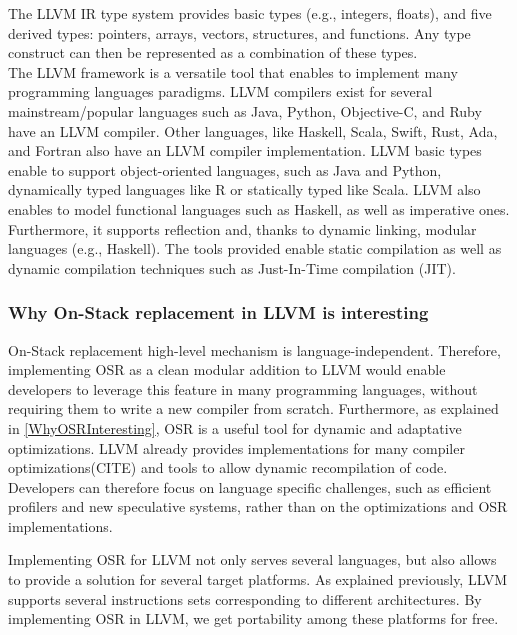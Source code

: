The LLVM IR type system provides basic types (e.g., integers, floats), and five derived types: pointers, arrays, vectors, structures, and functions.
Any type construct can then be represented as a combination of these types.\\

The LLVM framework is a versatile tool that enables to implement many programming languages paradigms.
LLVM compilers exist for several mainstream/popular languages such as Java, Python, Objective-C, and Ruby have an LLVM compiler.
Other languages, like Haskell, Scala, Swift, Rust, Ada, and Fortran also have an LLVM compiler implementation.
LLVM basic types enable to support object-oriented languages, such as Java and Python, dynamically typed languages like R or statically typed like Scala.
LLVM also enables to model functional languages such as Haskell, as well as imperative ones. 
Furthermore, it supports reflection and, thanks to dynamic linking, modular languages (e.g., Haskell).
The tools provided enable static compilation as well as dynamic compilation techniques such as Just-In-Time compilation (JIT).\\

\subsubsection{Why On-Stack replacement in LLVM is interesting}
On-Stack replacement high-level mechanism is language-independent.
Therefore, implementing OSR as a clean modular addition to LLVM would enable developers to leverage this feature in many programming languages, without requiring them to write a new compiler from scratch.
Furthermore, as explained in \ref{WhyOSRInteresting}, OSR is a useful tool for dynamic and adaptative optimizations.
LLVM already provides implementations for many compiler optimizations(CITE) and tools to allow dynamic recompilation of code.
Developers can therefore focus on language specific challenges, such as efficient profilers and new speculative systems, rather than on the optimizations and OSR implementations.

Implementing OSR for LLVM not only serves several languages, but also allows to provide a solution for several target platforms.
As explained previously, LLVM supports several instructions sets corresponding to different architectures.
By implementing OSR in LLVM, we get portability among these platforms for free.\\


